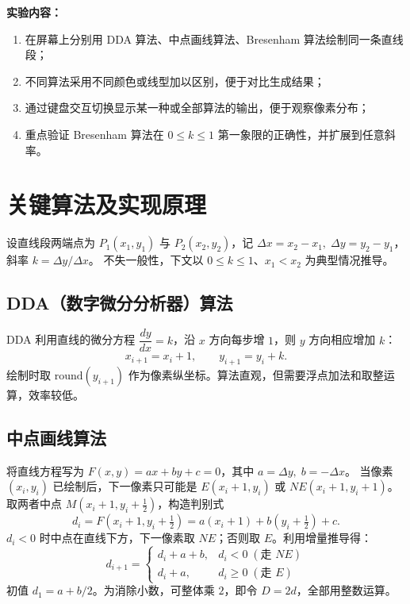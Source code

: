 \documentclass[a4paper,12pt]{ctexart}
\begin{document}
\textbf{实验内容：}
\begin{enumerate}[leftmargin=2em,itemsep=0.2em]
    \item 在屏幕上分别用 DDA 算法、中点画线算法、Bresenham 算法绘制同一条直线段；
    \item 不同算法采用不同颜色或线型加以区别，便于对比生成结果；
    \item 通过键盘交互切换显示某一种或全部算法的输出，便于观察像素分布；
    \item 重点验证 Bresenham 算法在 $0 \le k \le 1$ 第一象限的正确性，并扩展到任意斜率。
\end{enumerate}

\section{关键算法及实现原理}

设直线段两端点为 $P_1(x_1,y_1)$ 与 $P_2(x_2,y_2)$，记
$\Delta x = x_2-x_1,\;\Delta y = y_2-y_1$，斜率 $k = \Delta y / \Delta x$。
不失一般性，下文以 $0 \le k \le 1$、$x_1 < x_2$ 为典型情况推导。

\subsection{DDA（数字微分分析器）算法}

DDA 利用直线的微分方程
$\dfrac{dy}{dx}=k$，沿 $x$ 方向每步增 $1$，则 $y$ 方向相应增加 $k$：
\[
    x_{i+1}=x_i+1,\qquad y_{i+1}=y_i+k.
\]
绘制时取 $\mathrm{round}(y_{i+1})$ 作为像素纵坐标。算法直观，但需要浮点加法和取整运算，效率较低。

\subsection{中点画线算法}

将直线方程写为 $F(x,y)=ax+by+c=0$，其中 $a=\Delta y,\;b=-\Delta x$。
当像素 $(x_i,y_i)$ 已绘制后，下一像素只可能是 $E(x_i+1,y_i)$ 或 $NE(x_i+1,y_i+1)$。
取两者中点 $M(x_i+1, y_i+\tfrac{1}{2})$，构造判别式
\[
    d_i = F(x_i+1, y_i+\tfrac{1}{2}) = a(x_i+1) + b(y_i+\tfrac{1}{2}) + c .
\]
$d_i<0$ 时中点在直线下方，下一像素取 $NE$；否则取 $E$。利用增量推导得：
\[
    d_{i+1} =
    \begin{cases}
        d_i + a + b, & d_i<0\;(\text{走 } NE) \\
        d_i + a,     & d_i\ge 0\;(\text{走 } E)
    \end{cases}
\]
初值 $d_1 = a + b/2$。为消除小数，可整体乘 $2$，即令 $D = 2d$，全部用整数运算。
\end{document}
